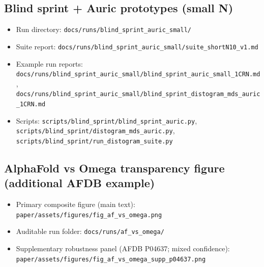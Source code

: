 \subsection*{Blind sprint + Auric prototypes (small N)}
\begin{itemize}
  \item Run directory: \texttt{docs/runs/blind\_sprint\_auric\_small/}
  \item Suite report: \texttt{docs/runs/blind\_sprint\_auric\_small/suite\_shortN10\_v1.md}
  \item Example run reports: \texttt{docs/runs/blind\_sprint\_auric\_small/blind\_sprint\_auric\_small\_1CRN.md}, \texttt{docs/runs/blind\_sprint\_auric\_small/blind\_sprint\_distogram\_mds\_auric\_1CRN.md}
  \item Scripts: \texttt{scripts/blind\_sprint/blind\_sprint\_auric.py}, \texttt{scripts/blind\_sprint/distogram\_mds\_auric.py}, \texttt{scripts/blind\_sprint/run\_distogram\_suite.py}
\end{itemize}

\subsection*{AlphaFold vs Omega transparency figure (additional AFDB example)}
\begin{itemize}
  \item Primary composite figure (main text): \texttt{paper/assets/figures/fig\_af\_vs\_omega.png}
  \item Auditable run folder: \texttt{docs/runs/af\_vs\_omega/}
  \item Supplementary robustness panel (AFDB P04637; mixed confidence): \texttt{paper/assets/figures/fig\_af\_vs\_omega\_supp\_p04637.png}
\end{itemize}

